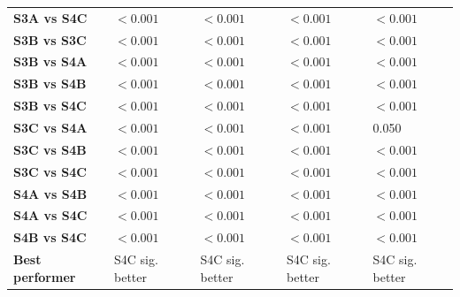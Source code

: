 \begin{table}[H]
{\begin{tabular}{lllll}
        \textbf{S3A vs S4C} & $< 0.001$ & $< 0.001$ & $< 0.001$ & $< 0.001$ \\
        \textbf{S3B vs S3C} & $< 0.001$ & $< 0.001$ & $< 0.001$ & $< 0.001$ \\
        \textbf{S3B vs S4A} & $< 0.001$ & $< 0.001$ & $< 0.001$ & $< 0.001$ \\
        \textbf{S3B vs S4B} & $< 0.001$ & $< 0.001$ & $< 0.001$ & $< 0.001$ \\
        \textbf{S3B vs S4C} & $< 0.001$ & $< 0.001$ & $< 0.001$ & $< 0.001$ \\
        \textbf{S3C vs S4A} & $< 0.001$ & $< 0.001$ & $< 0.001$ & 0.050 \\
        \textbf{S3C vs S4B} & $< 0.001$ & $< 0.001$ & $< 0.001$ & $< 0.001$ \\
        \textbf{S3C vs S4C} & $< 0.001$ & $< 0.001$ & $< 0.001$ & $< 0.001$ \\
        \textbf{S4A vs S4B} & $< 0.001$ & $< 0.001$ & $< 0.001$ & $< 0.001$ \\
        \textbf{S4A vs S4C} & $< 0.001$ & $< 0.001$ & $< 0.001$ & $< 0.001$ \\
        \textbf{S4B vs S4C} & $< 0.001$ & $< 0.001$ & $< 0.001$ & $< 0.001$ \\
        \textbf{Best performer} & S4C sig. better & S4C sig. better & S4C sig. better & S4C sig. better \\
        \bottomrule
    \end{tabular}}
\end{table}